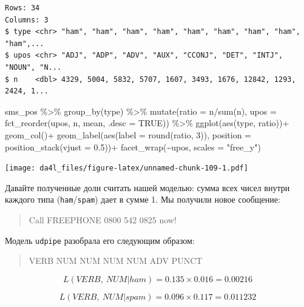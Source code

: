 \documentclass[
]{book}
\newenvironment{Shaded}{\begin{snugshade}}{\end{snugshade}}
\newcommand{\AttributeTok}[1]{\textcolor[rgb]{0.77,0.63,0.00}{#1}}
\newcommand{\ConstantTok}[1]{\textcolor[rgb]{0.00,0.00,0.00}{#1}}
\newcommand{\DecValTok}[1]{\textcolor[rgb]{0.00,0.00,0.81}{#1}}
\newcommand{\FloatTok}[1]{\textcolor[rgb]{0.00,0.00,0.81}{#1}}
\newcommand{\FunctionTok}[1]{\textcolor[rgb]{0.00,0.00,0.00}{#1}}
\newcommand{\NormalTok}[1]{#1}
\newcommand{\SpecialCharTok}[1]{\textcolor[rgb]{0.00,0.00,0.00}{#1}}
\newcommand{\StringTok}[1]{\textcolor[rgb]{0.31,0.60,0.02}{#1}}
\begin{document}
\begin{verbatim}
Rows: 34
Columns: 3
$ type <chr> "ham", "ham", "ham", "ham", "ham", "ham", "ham", "ham", "ham",...
$ upos <chr> "ADJ", "ADP", "ADV", "AUX", "CCONJ", "DET", "INTJ", "NOUN", "N...
$ n    <dbl> 4329, 5004, 5832, 5707, 1607, 3493, 1676, 12842, 1293, 2424, 1...
\end{verbatim}

\begin{Shaded}
\begin{Highlighting}[]
\NormalTok{sms\_pos }\SpecialCharTok{\%\textgreater{}\%} 
  \FunctionTok{group\_by}\NormalTok{(type) }\SpecialCharTok{\%\textgreater{}\%} 
  \FunctionTok{mutate}\NormalTok{(}\AttributeTok{ratio =}\NormalTok{ n}\SpecialCharTok{/}\FunctionTok{sum}\NormalTok{(n),}
         \AttributeTok{upos =} \FunctionTok{fct\_reorder}\NormalTok{(upos, n, mean, }\AttributeTok{.desc =} \ConstantTok{TRUE}\NormalTok{)) }\SpecialCharTok{\%\textgreater{}\%}
  \FunctionTok{ggplot}\NormalTok{(}\FunctionTok{aes}\NormalTok{(type, ratio))}\SpecialCharTok{+}
  \FunctionTok{geom\_col}\NormalTok{()}\SpecialCharTok{+}
  \FunctionTok{geom\_label}\NormalTok{(}\FunctionTok{aes}\NormalTok{(}\AttributeTok{label =} \FunctionTok{round}\NormalTok{(ratio, }\DecValTok{3}\NormalTok{)), }\AttributeTok{position =} \FunctionTok{position\_stack}\NormalTok{(}\AttributeTok{vjust =} \FloatTok{0.5}\NormalTok{))}\SpecialCharTok{+}
  \FunctionTok{facet\_wrap}\NormalTok{(}\SpecialCharTok{\textasciitilde{}}\NormalTok{upos, }\AttributeTok{scales =} \StringTok{"free\_y"}\NormalTok{)}
\end{Highlighting}
\end{Shaded}

\texttt{[image: da4l\_files/figure-latex/unnamed-chunk-109-1.pdf]}

Давайте полученные доли считать нашей моделью: сумма всех чисел внутри каждого типа (\texttt{ham}/\texttt{spam}) дает в сумме 1. Мы получили новое сообщение:

\begin{quote}
Call FREEPHONE 0800 542 0825 now!
\end{quote}

Модель \texttt{udpipe} разобрала его следующим образом:

\begin{quote}
VERB NUM NUM NUM NUM ADV PUNCT
\end{quote}

\[L(VERB,\ NUM|ham) = 0.135 \times 0.016 = 0.00216\]

\[L(VERB,\ NUM|spam) = 0.096 \times 0.117 = 0.011232\]
\end{document}
